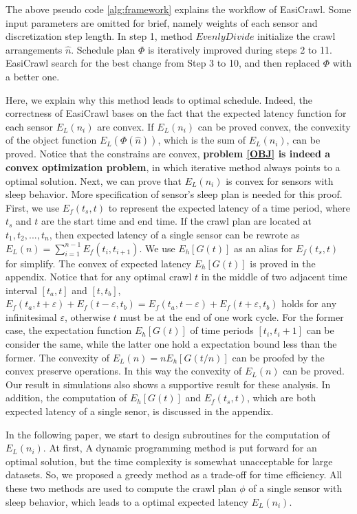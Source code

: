 \documentclass[conference]{IEEEtran}
\begin{document}
The above pseudo code \ref{alg:framework} explains the workflow of EasiCrawl. 
Some input parameters are omitted for brief, namely weights of each sensor and discretization step length.
In step 1, method $EvenlyDivide$ initialize the crawl arrangements $\hat{n}$. 
Schedule plan $\Phi$ is iteratively improved during steps 2 to 11. 
EasiCrawl search for the best change from Step 3 to 10, and then replaced $\Phi$ with a better one.

Here, we explain why this method leads to optimal schedule.
Indeed, the correctness of EasiCrawl bases on the fact that the expected latency function for each sensor $E_L(n_i)$ are convex. 
If $E_L(n_i)$ can be proved convex, the convexity of the object function $E_L(\Phi(\hat{n}))$, which is the sum of $E_L(n_i)$, can be proved.
Notice that the constrains are convex, \textbf{problem \eqref{OBJ} is indeed a convex optimization problem}, in which iterative method always points to a optimal solution.
Next, we can prove that $E_L(n_i)$ is convex for sensors with sleep behavior.
More specification of sensor's sleep plan is needed for this proof.
First, we use $E_f(t_s,t)$ to represent the expected latency of a time period, where $t_s$ and $t$ are the start time and end time. 
If the crawl plan are located at $t_1,t_2,...,t_n$, then expected latency of a single sensor can be rewrote as $E_L(n) = \sum_{i=1}^{n-1}E_f(t_{i},t_{i+1})$. 
We use $E_h[G(t)]$ as an alias for $E_f(t_s,t)$ for simplify.
The convex of expected latency $E_h[G(t)]$ is proved in the appendix. 
Notice that for any optimal crawl $t$ in the middle of two adjacent time interval $[t_a,t]$ and $[t,t_b]$, $E_f(t_a,t+\varepsilon)+E_f(t-\varepsilon,t_b) = E_f(t_a,t-\varepsilon)+E_f(t+\varepsilon,t_b)$ holds for any infinitesimal $\varepsilon$, otherwise $t$ must be at the end of one work cycle.
For the former case, the expectation function $E_h[G(t)]$ of time periods $[t_i,t_i+1]$ can be consider the same, while the latter one hold a expectation bound less than the former.
The convexity of $E_L(n) = n E_h[G(t/n)]$ can be proofed by the convex preserve operations\cite{boyd2004convex}. 
In this way the convexity of $E_L(n)$ can be proved.
Our result in simulations also shows a supportive result for these analysis.
In addition, the computation of $E_h[G(t)]$ and $E_f(t_s,t)$, which are both expected latency of a single senor, is discussed in the appendix.

In the following paper, we start to design subroutines for the computation of $E_L(n_i)$.
At first, A dynamic programming method is put forward for an optimal solution,  but the time complexity is somewhat unacceptable for large datasets.
So, we proposed a greedy method as a trade-off for time efficiency. 
All these two methods are used to compute the crawl plan $\phi$ of a single sensor with sleep behavior, which leads to a optimal expected latency $E_L(n_i)$.
\end{document}
